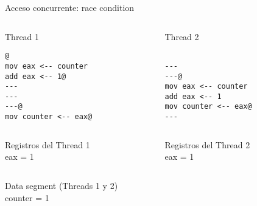 \begin{frame}[fragile]{Acceso concurrente: race condition}
   \begin{columns}
      \begin{column}{.5\linewidth}
          Thread 1
         \begin{lstlisting}[style=dimmided42,firstnumber=0]
         @
mov eax <-- counter
add eax <-- 1@
---
---
---@
mov counter <-- eax@
         \end{lstlisting}
      \end{column}
      \begin{column}{.45\linewidth}
          Thread 2
         \begin{lstlisting}[style=dimmided42,firstnumber=0]

---
---@
mov eax <-- counter
add eax <-- 1
mov counter <-- eax@
---
         \end{lstlisting}
      \end{column}
   \end{columns}
    \vspace{1em}
   \begin{columns}
      \begin{column}{.5\linewidth}
          Registros del Thread 1\\
eax = 1
      \end{column}
      \begin{column}{.45\linewidth}
          Registros del Thread 2\\
eax = 1
      \end{column}
   \end{columns}
    \vspace{1.4em}
    \centering
   \begin{columns}
      \begin{column}{.5\linewidth}
          Data segment (Threads 1 y 2)\\
counter = 1
      \end{column}
   \end{columns}
\end{frame}

